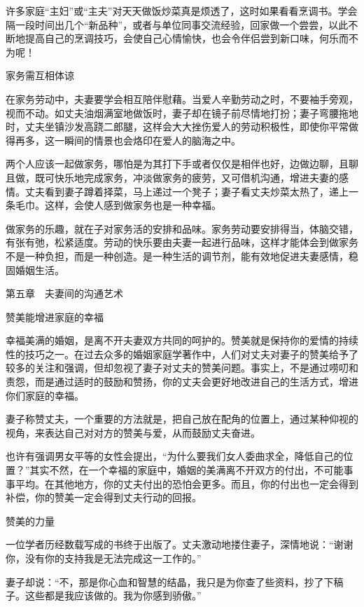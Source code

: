 \documentclass[12pt,UTF8]{ctexbook}
\begin{document}
许多家庭“主妇”或“主夫”对天天做饭炒菜真是烦透了，这时如果看看烹调书。学会隔一段时间出几个“新品种”，或者与单位同事交流经验，回家做一个尝尝，以此不断地提高自己的烹调技巧，会使自己心情愉快，也会令伴侣尝到新口味，何乐而不为呢！





家务需互相体谅


在家务劳动中，夫妻要学会相互陪伴慰藉。当爱人辛勤劳动之时，不要袖手旁观，视而不动。如丈夫油烟满室地做饭时，妻子却在镜子前尽情地打扮；妻子弯腰拖地时，丈夫坐镇沙发高跷二郎腿，这样会大大挫伤爱人的劳动积极性，即使你平常做得再多，这一瞬间的情景也会烙印在爱人的脑海之中。

两个人应该一起做家务，哪怕是为其打下手或者仅仅是相伴也好，边做边聊，且聊且做，既可快乐地完成家务，冲淡做家务的疲劳，又可借机沟通，增进夫妻的感情。丈夫看到妻子蹲着择菜，马上递过一个凳子；妻子看丈夫炒菜太热了，递上一条毛巾。这样，会使人感到做家务也是一种幸福。

做家务的乐趣，就在子对家务活的安排和品味。家务劳动要安排得当，体脑交错，有张有弛，松紧适度。劳动的快乐要由夫妻一起进行品味，这样才能体会到做家务不是一种负担，而是一种创造。是一种生活的调节剂，能有效地促进夫妻感情，稳固婚姻生活。





第五章　夫妻间的沟通艺术


赞美能增进家庭的幸福


幸福美满的婚姻，是离不开夫妻双方共同的呵护的。赞美就是保持你的爱情的持续性的技巧之一。在过去众多的婚姻家庭学著作中，人们对丈夫对妻子的赞美给予了较多的关注和强调，但却忽视了妻子对丈夫的赞美问题。事实上，不是通过唠叨和责怨，而是通过适时的鼓励和赞扬，你的丈夫会更好地改进自己的生活方式，增进你们家庭的幸福。

妻子称赞丈夫，一个重要的方法就是，把自己放在配角的位置上，通过某种仰视的视角，来表达自己对对方的赞美与爱，从而鼓励丈夫奋进。

也许有强调男女平等的女性会提出，“为什么要我们女人委曲求全，降低自己的位置？”其实不然，在一个幸福的家庭中，婚姻的美满离不开双方的付出，不可能事事平均。在其他地方，你的丈夫付出的恐怕会更多。而且，你的付出也一定会得到补偿，你的赞美一定会得到丈夫行动的回报。





赞美的力量


一位学者历经数载写成的书终于出版了。丈夫激动地搂住妻子，深情地说：“谢谢你，没有你的支持我是无法完成这一工作的。”

妻子却说：“不，那是你心血和智慧的结晶，我只是为你查了些资料，抄了下稿子。这些都是我应该做的。我为你感到骄傲。”
\end{document}
